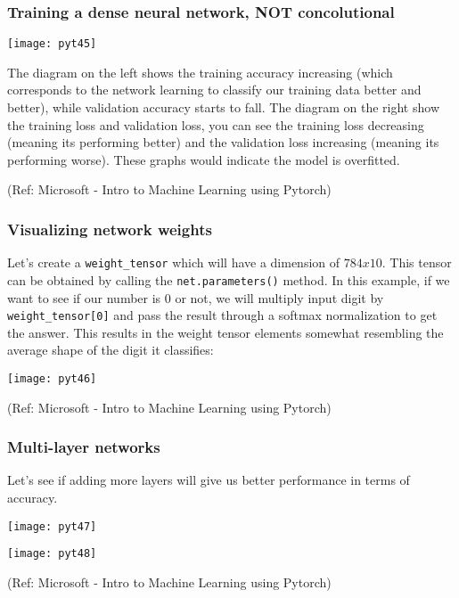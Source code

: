 \begin{frame}[fragile] \frametitle{Training a dense neural network, NOT concolutional}

\begin{center}
\texttt{[image: pyt45]}
\end{center}

The diagram on the left shows the training accuracy increasing (which corresponds to the network learning to classify our training data better and better), while validation accuracy starts to fall. The diagram on the right show the training loss and validation loss, you can see the training loss decreasing (meaning its performing better) and the validation loss increasing (meaning its performing worse). These graphs would indicate the model is overfitted.

\tiny{(Ref: Microsoft - Intro to Machine Learning using Pytorch)}
\end{frame}

\begin{frame}[fragile] \frametitle{Visualizing network weights}

Let's create a \lstinline|weight_tensor| which will have a dimension of $784x10$. This tensor can be obtained by calling the \lstinline|net.parameters()| method. In this example, if we want to see if our number is 0 or not, we will multiply input digit by \lstinline|weight_tensor[0]| and pass the result through a softmax normalization to get the answer. This results in the weight tensor elements somewhat resembling the average shape of the digit it classifies:


\begin{center}
\texttt{[image: pyt46]}
\end{center}


\tiny{(Ref: Microsoft - Intro to Machine Learning using Pytorch)}
\end{frame}

\begin{frame}[fragile] \frametitle{Multi-layer networks}

Let's see if adding more layers will give us better performance in terms of accuracy.

\begin{center}
\texttt{[image: pyt47]}

\texttt{[image: pyt48]}

\end{center}


\tiny{(Ref: Microsoft - Intro to Machine Learning using Pytorch)}
\end{frame}



